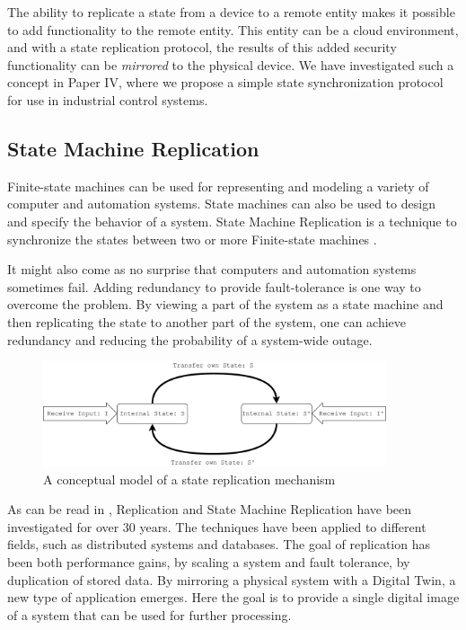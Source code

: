 The ability to replicate a state from a device to a remote entity makes it possible to add functionality to the remote entity. This entity can be a cloud environment, and with a state replication protocol, the results of this added security functionality can be \emph{mirrored} to the physical device. We have investigated such a concept in Paper IV, where we propose a simple state synchronization protocol for use in industrial control systems.

\subsection{State Machine Replication}
Finite-state machines can be used for representing and modeling a variety of computer and automation systems. State machines can also be used to design and specify the behavior of a system. State Machine Replication is a technique to synchronize the states between two or more Finite-state machines \cite{lamport1984using}. 

It might also come as no surprise that computers and automation systems sometimes fail. Adding redundancy to provide fault-tolerance is one way to overcome the problem. By viewing a part of the system as a state machine and then replicating the state to another part of the system, one can achieve redundancy and reducing the probability of a system-wide outage. 


\begin{figure}[ht]
\centering
\includegraphics[width=0.9\textwidth]{images/State_replication.pdf}
\caption{A conceptual model of a state replication mechanism}
\label{fig:state-replication}
\end{figure}

As can be read in \cite{charron2010replication}, Replication and State Machine Replication have been investigated for over 30 years. The techniques have been applied to different fields, such as distributed systems and databases. The goal of replication has been both performance gains, by scaling a system and fault tolerance, by duplication of stored data. By mirroring a physical system with a Digital Twin, a new type of application emerges. Here the goal is to provide a single digital image of a system that can be used for further processing.

